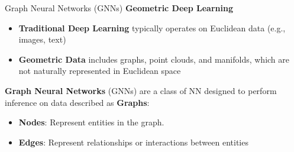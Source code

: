 \begin{frame}{Graph Neural Networks (GNNs)}
  \textbf{Geometric Deep Learning} 

  \begin{itemize}
      \item \textbf{Traditional Deep Learning} typically operates on Euclidean data (e.g., images, text)
      \item \textbf{Geometric Data} includes graphs, point clouds, and manifolds, which are not naturally represented in Euclidean space
  \end{itemize}

  \textbf{Graph Neural Networks} (GNNs) are a class of NN designed to perform inference on data described as \textbf{Graphs}: 
  \begin{itemize}
    \item \textbf{Nodes}: Represent entities in the graph.
    \item \textbf{Edges}: Represent relationships or interactions between entities
  \end{itemize}

\end{frame}

